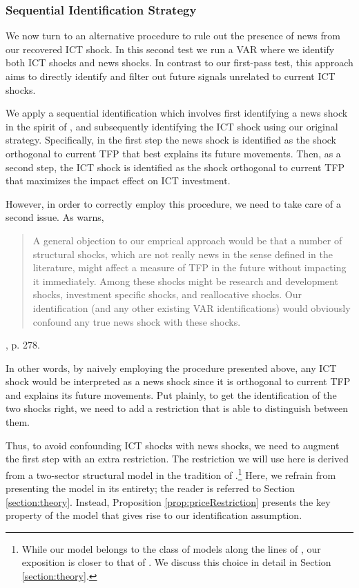\documentclass[12pt]{article}
\begin{document}
\subsubsection{Sequential Identification Strategy}\label{section:twosteps}

We now turn to an alternative procedure to rule out the presence of news from our recovered ICT shock. In this second test we run a VAR where we identify both ICT shocks and news shocks. In contrast to our first-pass test, this approach aims to directly identify and filter out future signals unrelated to current ICT shocks.

We apply a sequential identification which involves first identifying a news shock in the spirit of \cite{barsky2011news}, and subsequently identifying the ICT shock using our original strategy. Specifically, in the first step the news shock is identified as the shock orthogonal to current TFP that best explains its future movements. Then, as a second step, the ICT shock is identified as the shock orthogonal to current TFP that maximizes the impact effect on ICT investment. 

However, in order to correctly employ this procedure, we need to take care of a second issue. As \cite{barsky2011news} warns, 

\begin{quote} A general objection to our emprical approach would be that a number of structural shocks, which are not really news in the sense defined in the literature, might affect a measure of TFP in the future without impacting it immediately. Among these shocks might be research and development shocks, investment specific shocks, and reallocative shocks. Our identification (and any other existing VAR identifications) would obviously confound any true news shock with these shocks. %
\end{quote}

\hspace{9cm} \cite{barsky2011news}, p. 278.

\vspace{0.5cm}

In other words, by naively employing the procedure presented above, any ICT shock would be interpreted as a news shock since it is orthogonal to current TFP and explains its future movements. Put plainly, to get the identification of the two shocks right, we need to add a restriction that is able to distinguish between them.

Thus, to avoid confounding ICT shocks with news shocks, we need to augment the first step with an extra restriction. The restriction we will use here is derived from a two-sector structural model in the tradition of \cite{greenwood1997long}.\footnote{While our model belongs to the class of models along the lines of \cite{greenwood1997long}, our exposition is closer to that of \cite{oulton2007investment}. We discuss this choice in detail in Section \ref{section:theory}.} Here, we refrain from presenting the model in its entirety; the reader is referred to Section \ref{section:theory}. Instead, Proposition \ref{prop:priceRestriction} presents the key property of the model that gives rise to our identification assumption. 
\end{document}
